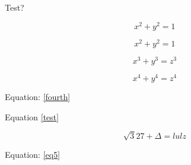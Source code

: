 \documentclass{article}
\begin{document}
   Test?

   $$ x^2 + y^2 = 1$$

   \[ x^2 + y^2 = 1 \]

   \begin{equation}\label{test}
        x^3 + y^3 = z^3
    \end{equation}

   \begin{equation}\label{fourth}
       x^4 + y^4 = z^4
   \end{equation}
    

   Equation: \ref{fourth}

   Equation \ref{test}

    
   \begin{equation*}\tag{Eq 5}\label{eq5}
       \sqrt{3}{27} + \Delta = lulz
   \end{equation*}



   Equation: \ref{eq5}
\end{document}
